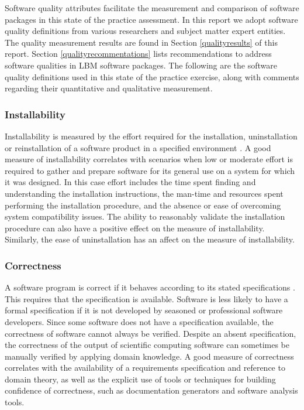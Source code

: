 \documentclass[12pt, notitlepage]{article}
\begin{document}
Software quality attributes facilitate the measurement and comparison of software packages in this state of the practice assessment. In this report we adopt software quality definitions from various researchers and subject matter expert entities. The quality measurement results are found in Section \ref{qualityresults} of this report. Section \ref{qualityrecommentations} lists recommendations to address software qualities in LBM software packages. The following are the software quality definitions used in this state of the practice exercise, along with comments regarding their quantitative and qualitative measurement.

\subsubsection{Installability} 

Installability is measured by the effort required for the installation, uninstallation or reinstallation of a software product in a specified
environment \citep{ISO/IEC25010} \citep{lenhard2013measuring}. A good measure of installability correlates with scenarios when low or moderate effort is required to gather and prepare software for its general use on a system for which it was designed. In this case effort includes the time spent finding and understanding the installation instructions, the man-time and resources spent performing the installation procedure, and the absence or ease of overcoming system compatibility issues. The ability to reasonably validate the installation procedure can also have a positive effect on the measure of installability. Similarly, the ease of uninstallation has an affect on the measure of installability. 

\subsubsection{Correctness}

 A software program is correct if it behaves according to its stated
specifications \citep{GhezziEtAl2003}. This requires that the specification is available. Software is less likely to have a formal specification if it is not developed by seasoned or professional software developers. Since some software does not have a specification available, the correctness of software cannot always be verified. Despite an absent specification, the correctness of the output of scientific computing software can sometimes be manually verified by applying domain knowledge. A good measure of correctness correlates with the availability of a requirements specification and reference to domain theory, as well as the explicit use of tools or techniques for building confidence of correctness, such as documentation generators and software analysis tools.
\end{document}
